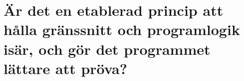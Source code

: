 

\chapter{Är det en etablerad princip att hålla gränssnitt och
  programlogik isär, och gör det programmet lättare att pröva?}
\label{app:grafik-separation}


